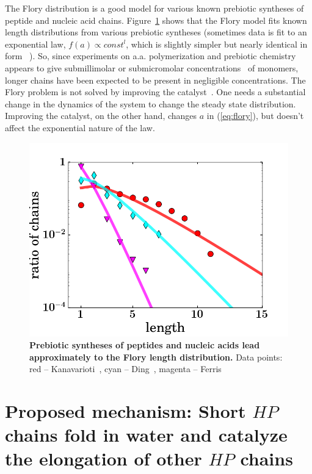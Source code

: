\documentclass[journal=jacsat,manuscript=article,layout=twocolumn]{achemso}
\begin{document}
The Flory distribution is a good model for various known prebiotic syntheses of peptide and nucleic 
acid chains.  Figure~\ref{fig:some_flory} shows that the Flory model fits known length 
distributions from various prebiotic syntheses (sometimes data is fit to an exponential law, 
$f(a)\propto 
const^l$, which is slightly simpler but nearly identical in form 
~\cite{nowak2008prevolutionary,Derr2012}).  So, since experiments on a.a. polymerization and 
prebiotic chemistry appears to give submillimolar or submicromolar 
concentrations~\cite{Stribling1987,Huber1998,Aubrey2009,Kanavarioti2001,Lazcano1996} of monomers, 
longer chains have been expected to be present in negligible concentrations.  The Flory problem is 
not solved by improving the catalyst~\cite{Derr2012}. 
One needs 
a substantial change in the dynamics of the system to change the steady state distribution. 
Improving the catalyst, on the other hand, changes $a$ in (\ref{eq:flory}), but doesn't affect the 
exponential nature of the law.

\begin{figure}[h!]
  \centering
  \includegraphics[width=\columnwidth]{pictures/some_flory.png} 
  \caption{\textbf{Prebiotic syntheses of peptides and nucleic acids lead approximately to the 
Flory length distribution.}  Data 
points: red -- Kanavarioti~\cite{Kanavarioti2001}, cyan -- Ding~\cite{Ding1996}, 
magenta -- Ferris~\cite{Ferris1999}}
  \label{fig:some_flory}
\end{figure}


\section{Proposed mechanism: Short $HP$ chains fold in water and catalyze the elongation of other 
$HP$ chains}
\end{document}
